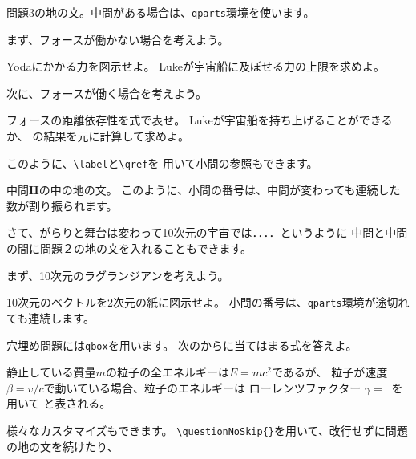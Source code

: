 \documentclass[dvipdfmx,11pt,a4j]{jarticle}
\begin{document}
問題3の地の文。中問がある場合は、{\tt qparts}環境を使います。

\begin{qparts}
	\qpart まず、フォースが働かない場合を考えよう。
		\begin{qlist}
			\qitem Yodaにかかる力を図示せよ。
			\qitem Lukeが宇宙船に及ぼせる力の上限を求めよ。
		\end{qlist}
        
	\qpart 次に、フォースが働く場合を考えよう。
		\begin{qlist}
			\qitem \label{q:forcerange}
				フォースの距離依存性を式で表せ。
			\qitem Lukeが宇宙船を持ち上げることができるか、
				の結果を元に計算して求めよ。
				
				このように、{\tt \verb"\label"}と{\tt \verb"\qref"}を
				用いて小問の参照もできます。
	        \end{qlist}
	        
	        中問{\bf II}の中の地の文。
	       このように、小問の番号は、中問が変わっても連続した数が割り振られます。
\end{qparts}

\bigskip
さて、がらりと舞台は変わって10次元の宇宙では．．．．というように
中問と中問の間に問題２の地の文を入れることもできます。

\begin{qparts}
	\qpart まず、10次元のラグランジアンを考えよう。
		\begin{qlist}
			\qitem 10次元のベクトルを2次元の紙に図示せよ。
			\qitem 小問の番号は、{\tt qparts}環境が途切れても連続します。
		\end{qlist}

\end{qparts}

\clearpage
{}

穴埋め問題には\texttt{qbox}を用います。
次のからに当てはまる式を答えよ。

\begin{qlist}
	\qitem 静止している質量$m$の粒子の全エネルギーは$E = mc^2$であるが、
		粒子が速度$\beta = v/c$で動いている場合、粒子のエネルギーは
		ローレンツファクター $\gamma =\ $\qbox{} を用いて \qbox{}と表される。
\end{qlist}
\clearpage
{}
様々なカスタマイズもできます。
\verb"\questionNoSkip{}"を用いて、改行せずに問題の地の文を続けたり、
\end{document}
